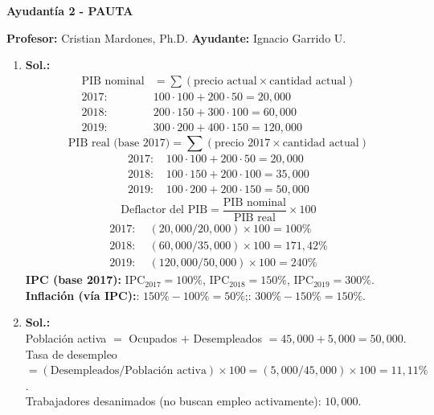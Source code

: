 \documentclass[11pt,addpoints]{article}
\begin{document}
\vspace*{0.05cm} %

\begin{center}
{\Large \bfseries Ayudantía 2 - \textbf{PAUTA} \\[0.5cm]}
\end{center}

\textbf{Profesor:} Cristian Mardones, Ph.D. \quad
\textbf{Ayudante:} Ignacio Garrido U.

\bigskip
\begin{enumerate}

\item \textbf{Sol.:}
\begin{align*}
\text{PIB nominal} &= \sum (\text{precio actual}\times \text{cantidad actual})\\
\text{2017: } & 100\cdot100 + 200\cdot50 = 20{,}000\\
\text{2018: } & 200\cdot150 + 300\cdot100 = 60{,}000\\
\text{2019: } & 300\cdot200 + 400\cdot150 = 120{,}000
\end{align*}
\[
\text{PIB real (base 2017)}=\sum (\text{precio 2017}\times \text{cantidad actual})
\]
\begin{align*}
\text{2017: } & 100\cdot100 + 200\cdot50 = 20{,}000\\
\text{2018: } & 100\cdot150 + 200\cdot100 = 35{,}000\\
\text{2019: } & 100\cdot200 + 200\cdot150 = 50{,}000
\end{align*}
\[
\text{Deflactor del PIB} = \frac{\text{PIB nominal}}{\text{PIB real}}\times 100
\]
\begin{align*}
2017:&\; (20{,}000/20{,}000)\times 100 = 100\%\\
2018:&\; (60{,}000/35{,}000)\times 100 = 171{,}42\%\\
2019:&\; (120{,}000/50{,}000)\times 100 = 240\%
\end{align*}
\textbf{IPC (base 2017):} \; IPC$_{2017}=100\%$, \; IPC$_{2018}=150\%$, \; IPC$_{2019}=300\%$.\\
\textbf{Inflación (vía IPC):}: $150\%-100\%=50\%$;: $300\%-150\%=150\%$.

\bigskip

\item \textbf{Sol.:}\\
Población activa $=$ Ocupados $+$ Desempleados $=45{,}000+5{,}000=50{,}000$.\\
Tasa de desempleo $=(\text{Desempleados}/\text{Población activa})\times 100=(5{,}000/45{,}000)\times 100=11{,}11\%$.\\
Trabajadores desanimados (no buscan empleo activamente): $10{,}000$.


\end{enumerate}
\end{document}
